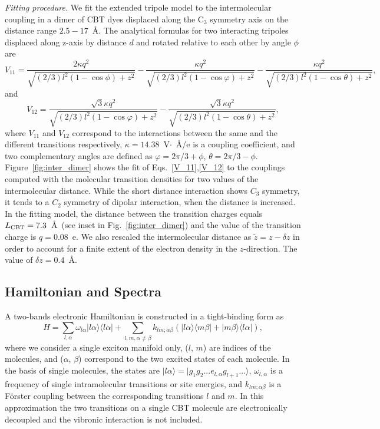 \documentclass[journal=jacs,manuscript=article]{achemso}
\begin{document}
\textit{Fitting procedure.} We fit the extended tripole model to the intermolecular coupling in a dimer of CBT dyes displaced along the C$_{3}$ symmetry axis on the distance range $2.5-17$~\AA. The analytical formulas for two interacting tripoles displaced along z-axis by distance $d$ and rotated relative to each other by angle $\phi$ are
\begin{equation}
    V_{11} = \frac{2 \kappa q^2 }{\sqrt{(2/3)l^2(1-\cos\phi)+z^2}}-\frac{\kappa q^2}{\sqrt{(2/3)l^2(1-\cos \varphi)+z^2}} - \frac{\kappa q^2}{\sqrt{(2/3)l^2(1-\cos \theta)+z^2}}, \label{V_11}
\end{equation}
and
\begin{equation}
    V_{12} = \frac{\sqrt{3}\kappa q^2}{\sqrt{(2/3)l^2(1-\cos \varphi) +z^2}} - \frac{\sqrt{3}\kappa q^2}{\sqrt{(2/3)l^2(1-\cos \theta)+z^2}},\label{V_12}
\end{equation}
\noindent where $V_{11}$ and $V_{12}$ correspond to the interactions between the same and the different transitions respectively, $\kappa=14.38$~V$\cdot$~\AA/e is a coupling coefficient, and two complementary angles are defined as $\varphi = 2\pi/3+\phi$, $\theta = 2\pi/3-\phi$. Figure~\ref{fig:inter_dimer} shows the fit of Eqs.~\ref{V_11},\ref{V_12} to the couplings computed with the molecular transition densities for two values of the intermolecular distance. While the short distance interaction shows $C_{3}$ symmetry, it tends to a $C_2$ symmetry of dipolar interaction, when the distance is increased. In the fitting model, the distance between the transition charges equals $L_{\rm CBT}=7.3$~\AA\ (see inset in Fig.~\ref{fig:inter_dimer}) and the value of the transition charge is $q=0.08$~e. We also rescaled the intermolecular distance as $\tilde{z}  = z - \delta z$ in order to account for a finite extent of the electron density in the $z$-direction. The value of $\delta z = 0.4$~\AA.

\subsection{Hamiltonian and Spectra}

A two-bands electronic Hamiltonian is constructed in a tight-binding form as
\begin{equation}
    H = \sum_{l,\alpha}\omega_{l\alpha}|l\alpha\rangle\langle l\alpha| + \sum_{l, m, \alpha \neq \beta} k_{lm;\alpha\beta}(|l\alpha\rangle\langle m\beta| + |m \beta\rangle\langle l\alpha|),\label{Ham_2band}
\end{equation}
\noindent where we consider a single exciton manifold only, ($l$, $m$) are indices of the molecules, and ($\alpha$, $\beta$) correspond to the two excited states of each molecule. In the basis of single molecules, the states are $|l\alpha\rangle = |g_1 g_2 ...e_{l,\alpha}g_{l+1}...\rangle $, $\omega_{l,\alpha}$   is a frequency of single intramolecular transitions or site energies, and $k_{lm;\alpha\beta}$ is a F\"orster coupling between the corresponding transitions $l$ and $m$.  In this approximation the two transitions on a single CBT molecule are electronically decoupled and the vibronic interaction is not included.
\end{document}
